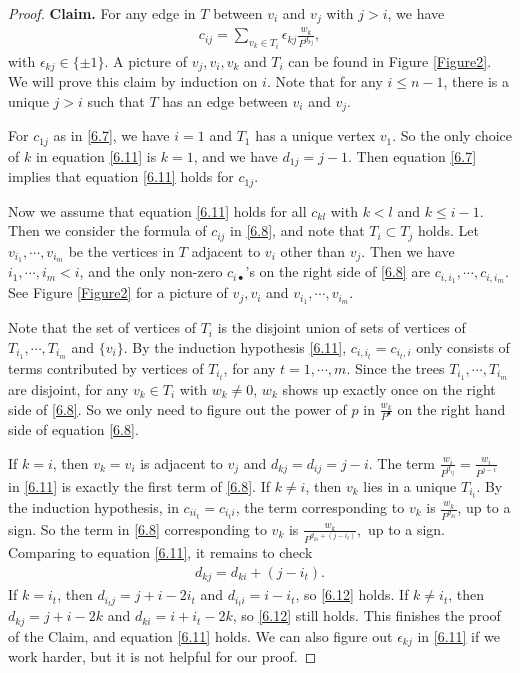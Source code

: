 \documentclass{amsart}
\numberwithin{equation}{section}
\theoremstyle{definition}
\begin{document}
\begin{proof}
{\bf Claim.} For any edge in $T$ between $v_i$ and $v_j$ with $j>i$, we have
\begin{align}\label{6.11}
c_{ij}=\sum_{v_k\in T_i}\epsilon_{kj}\frac{w_k}{P^{d_{kj}}},
\end{align}
with $\epsilon_{kj}\in \{\pm1\}$. A picture of $v_j,v_i,v_k$ and $T_i$ can be found in Figure \ref{Figure2}. We will prove this claim by induction on $i$. Note that for any $i\leq n-1$, there is a unique $j>i$ such that $T$ has an edge between $v_i$ and $v_j$. 


For $c_{1j}$ as in \eqref{6.7}, we have $i=1$ and $T_{1}$ has a unique vertex $v_1$. So the only choice of $k$ in equation \eqref{6.11} is $k=1$, and we have $d_{1j}=j-1$. Then equation \eqref{6.7} implies that equation \eqref{6.11} holds for $c_{1j}$.

Now we assume that equation \eqref{6.11} holds for all $c_{kl}$ with $k<l$ and $k\leq i-1$. Then we consider the formula of $c_{ij}$ in \eqref{6.8}, and note that $T_i\subset T_j$ holds. Let $v_{i_1},\cdots,v_{i_m}$ be the vertices in $T$ adjacent to $v_i$ other than $v_j$. Then we have $i_1,\cdots,i_m<i$, and the only non-zero $c_{i\bullet}$'s on the right side of \eqref{6.8} are $c_{i,i_1},\cdots,c_{i,i_m}$. See Figure \ref{Figure2} for a picture of $v_j,v_i$ and $v_{i_1},\cdots,v_{i_m}$.

Note that the set of vertices of $T_i$ is the disjoint union of sets of vertices of $T_{i_1},\cdots,T_{i_m}$ and $\{v_i\}$. 
By the induction hypothesis \eqref{6.11}, $c_{i,i_t}=c_{i_t,i}$ only consists of terms contributed by vertices of $T_{i_t}$, for any $t=1,\cdots,m$. Since the trees $T_{i_1},\cdots,T_{i_m}$ are disjoint, for any $v_k\in T_i$ with $w_k\ne 0$, $w_k$ shows up exactly once on the right side of \eqref{6.8}. So we only need to figure out the power of $p$ in $\frac{w_k}{P^{\bullet}}$ on the right hand side of equation \eqref{6.8}. 

If $k=i$, then $v_k=v_i$ is adjacent to $v_j$ and $d_{kj}=d_{ij}=j-i$. The term $\frac{w_i}{P^{d_{ij}}}=\frac{w_i}{P^{j-i}}$ in \eqref{6.11} is exactly the first term of \eqref{6.8}. If $k\ne i$, then $v_k$ lies in a unique $T_{i_t}$. By the induction hypothesis, in $c_{ii_t}=c_{i_ti}$, the term corresponding to $v_k$ is $\frac{w_k}{P^{d_{ki}}}$, up to a sign. So the term in \eqref{6.8} corresponding to $v_k$ is $\frac{w_k}{P^{d_{ki}+(j-i_t)}},$ up to a sign. Comparing to equation \eqref{6.11}, it remains to check 
\begin{align}\label{6.12}
d_{kj}=d_{ki}+(j-i_t).
\end{align}
If $k=i_t$, then $d_{i_tj}=j+i-2i_t$ and $d_{i_ti}=i-i_t$, so \eqref{6.12} holds. If $k\ne i_t$, then $d_{kj}=j+i-2k$ and $d_{ki}=i+i_t-2k$, so \eqref{6.12} still holds. This finishes the proof of the Claim, and equation \eqref{6.11} holds. We can also figure out $\epsilon_{kj}$ in \eqref{6.11} if we work harder, but it is not helpful for our proof.


\end{proof}
\end{document}
